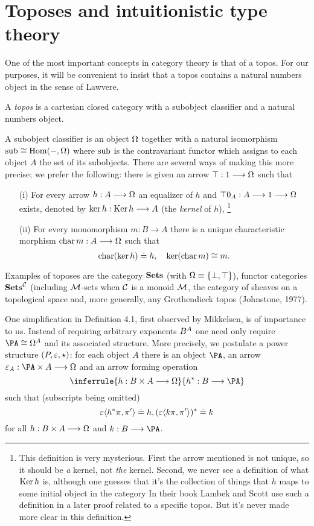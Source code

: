 \section{Toposes and intuitionistic type theory}

One of the most important concepts in category theory is that of a topos.
For our purposes, it will be convenient to insist that a topos contains a
natural numbers object in the sense of Lawvere.

\begin{defn}
A {\em topos} is a cartesian closed category with a subobject
classifier and a natural numbers object.

A subobject classifier is an object $\Omega$ together with a natural
isomorphism $\mathop{\rm sub} \cong \operatorname{{Hom}}(-, \Omega)$ where $\mathop{\rm sub}$ is the 
contravariant functor which
assigns to each object $A$ the set of its subobjects. There are several ways
of making this more precise; we prefer the following: there is given an arrow
$\top: 1 \longrightarrow \Omega$ such that
\begin{enumerate}
\item[(i)] For every arrow $h: A \longrightarrow \Omega$ an equalizer of $h$ and $\top 0_A: A \longrightarrow 1 \longrightarrow \Omega$
exists, denoted by $\mathop{\rm ker} h: \mathop{\rm Ker} h \longrightarrow A$ (the {\em kernel} of $h$),%
\footnote{This definition is very mysterious. First the arrow mentioned is not unique,
so it should be {\em a} kernel, not {\em the} kernel. Second, we never see a definition
of what $\mathop{\rm Ker} h$ is, although one guesses that it's the collection of things that $h$ maps
to some initial object in the category
In their book Lambek and Scott use such
a definition in a later proof related to a specific topos. 
But it's never made more clear in this definition.}
\item[(ii)] For every monomorphism $m: B \to A$ there is a unique characteristic
morphism $\mathop{\rm char} m: A \longrightarrow \Omega$ such that
\[
\mathop{\rm char}(\mathop{\rm ker} h) \doteq h, \quad \mathop{\rm ker}(\mathop{\rm char} m) \cong m.
\]
\end{enumerate}
\end{defn}
Examples of toposes are the category ${\mathbf {Sets}}$ (with $\Omega \equiv \{\bot, \top\}$),
functor categories ${\mathbf {Sets}}^{\mathcal C}$ (including ${\mathcal M}$-sets when $\mathcal C$ is 
a monoid ${\mathcal M}$, the category of sheaves on a topological space and, 
more generally, any Grothendieck topos (Johnstone, 1977).

One simplification in Definition 4.1, first observed by Mikkelsen, is of
importance to us. Instead of requiring arbitrary exponents $B^{A}$  one need only
require $\PA \cong \fexp{\OM}{A}$ and its associated structure.
More precisely, we postulate a power ~ structure $(P,\varepsilon,\star)$: 
for each object $A$ there is an object $\PA$, an arrow $\ev_A : \PA \times A\to \OM$
and an arrow forming operation
\[
\inferrule{h: B \times A \to \OM}{h^*: B \to \PA}
\]
such that (subscripts being omitted)
\[
\varepsilon\langle h^* \pi,\pi'\rangle \doteq h, (\varepsilon\langle k \pi,\pi'\rangle)^* \doteq k 
\]
for all $h: B\times A \longrightarrow \Omega$ and $k: B \to \PA$.

